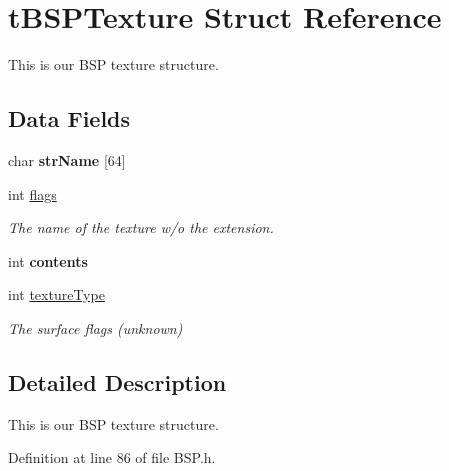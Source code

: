 \hypertarget{structt_b_s_p_texture}{}\section{t\+B\+S\+P\+Texture Struct Reference}
\label{structt_b_s_p_texture}


This is our B\+SP texture structure.  


\subsection*{Data Fields}
\begin{DoxyCompactItemize}
\item 
char {\bfseries str\+Name} \mbox{[}64\mbox{]}\hypertarget{structt_b_s_p_texture_ae5ca0bb138267023ae3f24ad918343d8}{}\label{structt_b_s_p_texture_ae5ca0bb138267023ae3f24ad918343d8}

\item 
int \hyperlink{structt_b_s_p_texture_a19e1022c09126d77ab36f811d79a3cc6}{flags}\hypertarget{structt_b_s_p_texture_a19e1022c09126d77ab36f811d79a3cc6}{}\label{structt_b_s_p_texture_a19e1022c09126d77ab36f811d79a3cc6}

\begin{DoxyCompactList}\small\item\em The name of the texture w/o the extension. \end{DoxyCompactList}\item 
int {\bfseries contents}\hypertarget{structt_b_s_p_texture_a1b36cf57425af891c491ec1be3b0e804}{}\label{structt_b_s_p_texture_a1b36cf57425af891c491ec1be3b0e804}

\item 
int \hyperlink{structt_b_s_p_texture_a759b56095afda6b996e877a4959c9460}{texture\+Type}\hypertarget{structt_b_s_p_texture_a759b56095afda6b996e877a4959c9460}{}\label{structt_b_s_p_texture_a759b56095afda6b996e877a4959c9460}

\begin{DoxyCompactList}\small\item\em The surface flags (unknown) \end{DoxyCompactList}\end{DoxyCompactItemize}


\subsection{Detailed Description}
This is our B\+SP texture structure. 

Definition at line 86 of file B\+S\+P.\+h.

